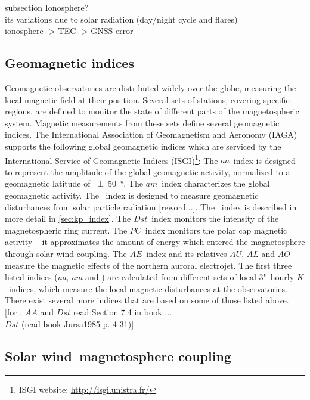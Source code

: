 subsection Ionosphere?\\
its variations due to solar radiation (day/night cycle and flares)\\
ionosphere -> TEC -> GNSS error\\


\subsection{Geomagnetic indices}
\label{sec:geomagnetic_indices}
Geomagnetic observatories are distributed widely over the globe, measuring the local magnetic field at their position. Several sets of stations, covering specific regions, are defined to monitor the state of different parts of the magnetospheric system. Magnetic measurements from these sets define several geomagnetic indices. The International Association of Geomagnetism and Aeronomy (IAGA)  supports the following global geomagnetic indices which are serviced by the International Service of Geomagnetic Indices (ISGI)\footnote{ISGI website: \url{http://isgi.unistra.fr/}}:
The $aa$~index is designed to represent the amplitude of the global geomagnetic activity, normalized to a geomagnetic latitude of \SI{+-50}{\degree}. The $am$~index characterizes the global geomagnetic activity. The \Kp{}~index is designed to measure geomagnetic disturbances from solar particle radiation [reword...]. The \Kp~index is described in more detail in \autoref{sec:kp_index}. The $Dst$~index monitors the intensity of the magnetospheric ring current. The $PC$~index monitors the polar cap magnetic activity -- it approximates the amount of energy which entered the magnetosphere through solar wind coupling. The $AE$~index and its relatives $AU$, $AL$ and $AO$ measure the magnetic effects of the northern auroral electrojet.
The first three listed indices (\textit{aa}, \textit{am} and \Kp{}) are calculated from different sets of local 3"~hourly $K$~indices, which measure the local magnetic disturbances at the observatories. There exist several more indices that are based on some of those listed above.\\

[for \Kp{}, $AA$ and $Dst$ read Section 7.4 in book \citet{Bothmer2007}...\\
$Dst$ (read book Jursa1985 p. 4-31)]\\


\subsection{Solar wind--magnetosphere coupling}
\label{sec:solar_wind_magnetosphere_coupling}

